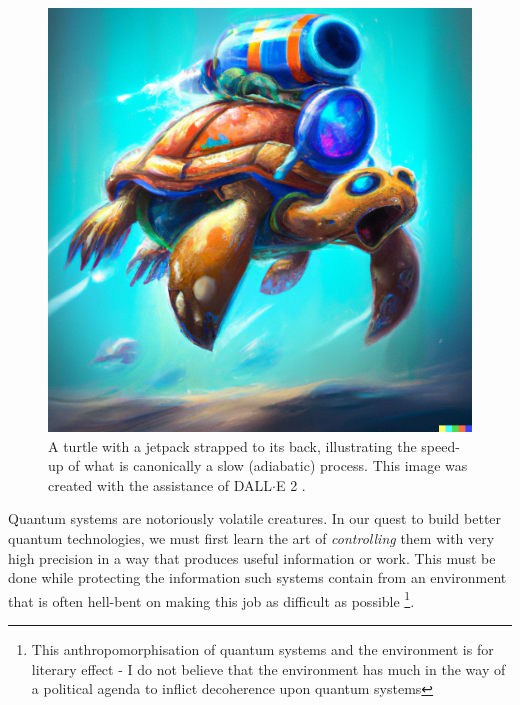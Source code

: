 \documentclass[a4paper,oneside,11pt]{book}
\begin{document}
\begin{figure}
\centering
\includegraphics[width=0.9\linewidth]{images/COLD_turle.png} \caption[DALL$\cdot$E turtle illustration.]{A turtle with a jetpack strapped to its back, illustrating the speed-up of what is canonically a slow (adiabatic) process. This image was created with the assistance of DALL$\cdot$E 2 \cite{noauthor_dalle_nodate}.}\label{fig:COLD_TURTLE}
\vspace{-5pt}
\end{figure}

Quantum systems are notoriously volatile creatures. In our quest to build better quantum technologies, we must first learn the art of \emph{controlling} them with very high precision in a way that produces useful information or work. This must be done while protecting the information such systems contain from an environment that is often hell-bent on making this job as difficult as possible \footnote{This anthropomorphisation of quantum systems and the environment is for literary effect - I do not believe that the environment has much in the way of a political agenda to inflict decoherence upon quantum systems}.
\end{document}
